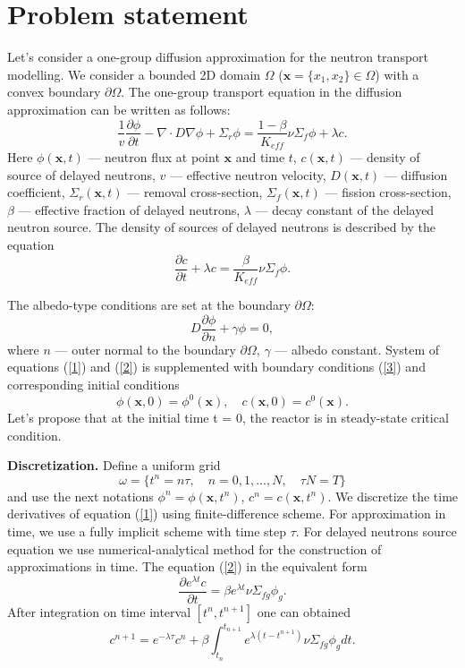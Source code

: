 \documentclass[10pt]{article}
\begin{document}
\section{Problem statement}
Let's consider a one-group diffusion approximation \cite{Stacey2007} for the neutron transport modelling. 
We consider a bounded 2D domain  $\Omega$ ($\bm x = \{x_1, x_2\} \in \Omega$) with a convex boundary $\partial \Omega$. 
The one-group transport equation in the diffusion approximation can be written as follows:
\begin{equation}\label{1}
	\frac{1}{v} \frac{\partial \phi}{\partial t} - \nabla \cdot D \nabla \phi + \Sigma_r \phi 
	= \frac{1 - \beta}{K_{eff}} \nu \Sigma_f \phi + \lambda c.
\end{equation} 
Here $\phi(\bm x,t)$ --- neutron flux  at point $\bm x$ and time $t$,
$c(\bm x,t)$ --- density of source of delayed neutrons,
$v$ --- effective neutron velocity,
$D(\bm x, t)$ --- diffusion coefficient, 
$\Sigma_r(\bm x,t)$ --- removal cross-section,
$\Sigma_f(\bm x,t)$ --- fission cross-section,
$\beta$ --- effective fraction of delayed neutrons, 
$\lambda$ --- decay constant of the delayed neutron source.
The density of sources of delayed neutrons is described by the equation
\begin{equation}\label{2}
	\frac{\partial c}{\partial t} + \lambda c = \frac{\beta}{K_{eff}} \nu \Sigma_f \phi.
\end{equation}

The albedo-type conditions are set at the boundary  $\partial \Omega$:
\begin{equation}\label{3}
	D \frac{\partial \phi}{\partial n} + \gamma \phi = 0,
\end{equation} 
where $n$ --- outer normal to the boundary $\partial \Omega$, $\gamma$ --- albedo constant.
System of equations (\ref{1}) and (\ref{2}) is supplemented with boundary conditions (\ref{3}) and corresponding initial conditions
\begin{equation}\label{4}
 \phi(\bm x, 0) = \phi^0(\bm x), \quad c(\bm x, 0) = c^0(\bm x).
\end{equation} 
Let's propose that at the initial time t = 0, the reactor is in steady-state critical condition.

\textbf{Discretization.}
Define a uniform grid
\[
	\omega = \{ t^n=n \tau, \quad n = 0,1,...,N, \quad \tau N = T \}
\]
and use the next notations $\phi^n = \phi(\bm{x}, t^n)$, $c^n = c(\bm{x}, t^n)$. 
We discretize the time derivatives of equation (\ref{1}) using finite-difference scheme. 
For approximation in time, we use a fully implicit scheme with time step $\tau$.
For delayed neutrons source equation we use numerical-analytical method for the construction of approximations in time.
The equation (\ref{2}) in the equivalent form
\[
	\frac{\partial e^{\lambda t} c}{\partial t} = 
	\beta e^{\lambda t} \nu \Sigma_{fg} \phi_g.
\]
After integration on time interval $[t^n, t^{n+1}]$ one can obtained
\begin{equation}\label{5}
	c^{n+1} = e^{-\lambda \tau} c^n + 
	\beta \int_{t_n}^{t_{n+1}} e^{\lambda (t - t^{n+1})} \nu \Sigma_{fg} \phi_g d t.
\end{equation}
\end{document}
